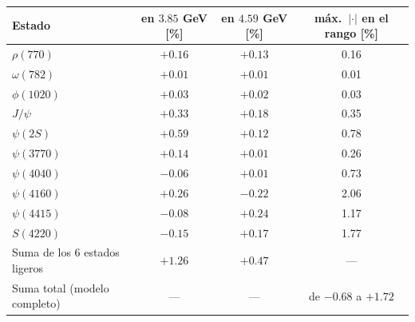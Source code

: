 \begin{tabular}{lccc}
\toprule
Estado & en $3.85$ GeV [\%] & en $4.59$ GeV [\%] & máx.\ $|\cdot|$ en el rango [\%] \\
\midrule
$\rho(770)$ & $+0.16$ & $+0.13$ & 0.16 \\
$\omega(782)$ & $+0.01$ & $+0.01$ & 0.01 \\
$\phi(1020)$ & $+0.03$ & $+0.02$ & 0.03 \\
$J/\psi$ & $+0.33$ & $+0.18$ & 0.35 \\
$\psi(2S)$ & $+0.59$ & $+0.12$ & 0.78 \\
$\psi(3770)$ & $+0.14$ & $+0.01$ & 0.26 \\
\midrule
$\psi(4040)$ & $-0.06$ & $+0.01$ & 0.73 \\
$\psi(4160)$ & $+0.26$ & $-0.22$ & 2.06 \\
$\psi(4415)$ & $-0.08$ & $+0.24$ & 1.17 \\
$S(4220)$ & $-0.15$ & $+0.17$ & 1.77 \\
\midrule
Suma de los 6 estados ligeros & $+1.26$ & $+0.47$ & --- \\
Suma total (modelo completo) & --- & --- & de $-0.68$ a $+1.72$ \\
\bottomrule
\end{tabular}
